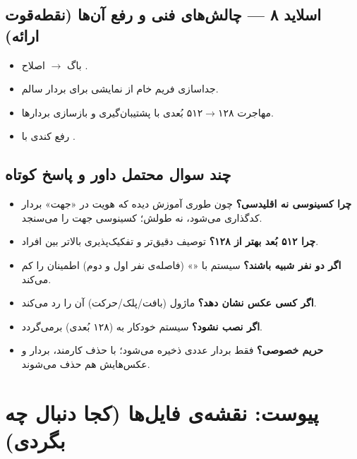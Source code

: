 \documentclass[12pt,a4paper]{article}
\begin{document}
\subsection*{اسلاید ۸ — چالش‌های فنی و رفع آن‌ها (نقطه‌قوت ارائه)}
\begin{itemize}[rightmargin=0pt]
  \item باگ  $\rightarrow$ اصلاح .
  \item جداسازی فریم خام از نمایشی برای بردار سالم.
  \item مهاجرت ۱۲۸$\rightarrow$۵۱۲ بُعدی با پشتیبان‌گیری و بازسازی بردارها.
  \item رفع کندی  با .
\end{itemize}

\subsection{چند سوال محتمل داور و پاسخ کوتاه}
\begin{itemize}[rightmargin=0pt]
  \item \textbf{چرا کسینوسی نه اقلیدسی؟} چون  طوری آموزش دیده که هویت در «جهت» بردار کدگذاری می‌شود، نه طولش؛ کسینوسی جهت را می‌سنجد.
  \item \textbf{چرا ۵۱۲ بُعد بهتر از ۱۲۸؟} توصیف دقیق‌تر و تفکیک‌پذیری بالاتر بین افراد.
  \item \textbf{اگر دو نفر شبیه باشند؟} سیستم با «» (فاصله‌ی نفر اول و دوم) اطمینان را کم می‌کند.
  \item \textbf{اگر کسی عکس نشان دهد؟} ماژول  (بافت/پلک/حرکت) آن را رد می‌کند.
  \item \textbf{اگر  نصب نشود؟} سیستم خودکار به  (۱۲۸ بُعدی) برمی‌گردد.
  \item \textbf{حریم خصوصی؟} فقط بردار عددی ذخیره می‌شود؛ با حذف کارمند، بردار و عکس‌هایش هم حذف می‌شوند.
\end{itemize}

\section*{پیوست: نقشه‌ی فایل‌ها (کجا دنبال چه بگردی)}
\end{document}
